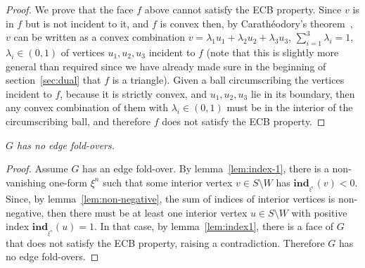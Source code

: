 \documentclass[11pt]{article}
\newcommand{\Sites}{S}
\begin{document}
\begin{proof}
We prove that the face $f$ above cannot satisfy the ECB property. 
Since $v$ is in $f$ but is not incident to it, and $f$ is convex
then, by Carath\'eodory's theorem~\cite{matousek2002lectures}, $v$ can be written as a 
convex combination $v=\lambda_1 u_1+\lambda_2 u_2+\lambda_3 u_3$,
$\sum_{i=1}^3\lambda_i=1$, $\lambda_i\in(0,1)$ of vertices $u_1,u_2,u_3$
incident to $f$ 
(note that this is slightly more general than required since we have 
already made sure in the beginning of section~\ref{sec:dual} that $f$ is a triangle). 
Given a ball circumscribing the vertices incident to $f$, 
because it is strictly convex, and $u_1,u_2,u_3$ lie in its boundary, 
then any convex combination of them with $\lambda_i\in(0,1)$ must be in the
interior of the circumscribing ball, and therefore $f$ does not satisfy the ECB property. 
\end{proof}







\emph{
$G$ has no edge fold-overs. }
\begin{proof}
Assume $G$ has an edge fold-over. 
By lemma~\ref{lem:index-1}, there is a non-vanishing one-form
$\xi^n$ such that some interior vertex $v\in \Sites\setminus W$ has $\mathbf{ind}_{_{\xi^n}}(v)<0$. 
Since, by lemma~\ref{lem:non-negative}, the sum of indices of interior vertices is
non-negative,
then there must be
at least one interior vertex $u\in \Sites\setminus W$ with positive index
$\mathbf{ind}_{_{\xi^n}}(u)=1$. In that case, by lemma~\ref{lem:index1}, there is a face of $G$ that does not satisfy the
ECB property, raising a contradiction. 
Therefore $G$ has no edge fold-overs. 
\end{proof}
\end{document}
